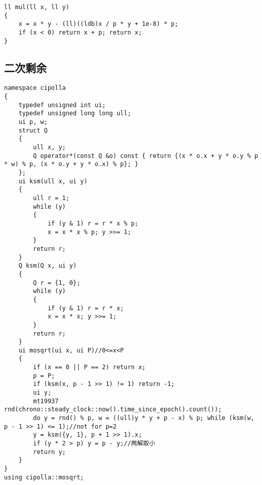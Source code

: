 \documentclass[12pt]{ctexart}
\begin{document}
\begin{lstlisting}
ll mul(ll x, ll y)
{
	x = x * y - (ll)((ldb)x / p * y + 1e-8) * p;
	if (x < 0) return x + p; return x;
}

\end{lstlisting}

\subsection{二次剩余}

\begin{lstlisting}
namespace cipolla
{
	typedef unsigned int ui;
	typedef unsigned long long ull;
	ui p, w;
	struct Q
	{
		ull x, y;
		Q operator*(const Q &o) const { return {(x * o.x + y * o.y % p * w) % p, (x * o.y + y * o.x) % p}; }
	};
	ui ksm(ull x, ui y)
	{
		ull r = 1;
		while (y)
		{
			if (y & 1) r = r * x % p;
			x = x * x % p; y >>= 1;
		}
		return r;
	}
	Q ksm(Q x, ui y)
	{
		Q r = {1, 0};
		while (y)
		{
			if (y & 1) r = r * x;
			x = x * x; y >>= 1;
		}
		return r;
	}
	ui mosqrt(ui x, ui P)//0<=x<P
	{
		if (x == 0 || P == 2) return x;
		p = P;
		if (ksm(x, p - 1 >> 1) != 1) return -1;
		ui y;
		mt19937 rnd(chrono::steady_clock::now().time_since_epoch().count());
		do y = rnd() % p, w = ((ull)y * y + p - x) % p; while (ksm(w, p - 1 >> 1) <= 1);//not for p=2
		y = ksm({y, 1}, p + 1 >> 1).x;
		if (y * 2 > p) y = p - y;//两解取小
		return y;
	}
}
using cipolla::mosqrt;

\end{lstlisting}
\end{document}
